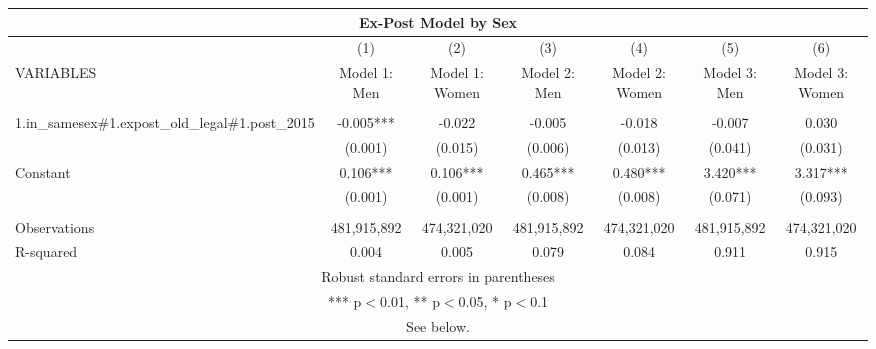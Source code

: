 \begin{tabular}{lcccccc}
\multicolumn{7}{c}{Ex-Post Model by Sex} \\ \hline
 & (1) & (2) & (3) & (4) & (5) & (6) \\
VARIABLES & Model 1: Men & Model 1: Women & Model 2: Men & Model 2: Women & Model 3: Men & Model 3: Women \\ \hline
 &  &  &  &  &  &  \\
1.in\_samesex\#1.expost\_old\_legal\#1.post\_2015 & -0.005*** & -0.022 & -0.005 & -0.018 & -0.007 & 0.030 \\
 & (0.001) & (0.015) & (0.006) & (0.013) & (0.041) & (0.031) \\
Constant & 0.106*** & 0.106*** & 0.465*** & 0.480*** & 3.420*** & 3.317*** \\
 & (0.001) & (0.001) & (0.008) & (0.008) & (0.071) & (0.093) \\
 &  &  &  &  &  &  \\
Observations & 481,915,892 & 474,321,020 & 481,915,892 & 474,321,020 & 481,915,892 & 474,321,020 \\
 R-squared & 0.004 & 0.005 & 0.079 & 0.084 & 0.911 & 0.915 \\ \hline
\multicolumn{7}{c}{ Robust standard errors in parentheses} \\
\multicolumn{7}{c}{ *** p$<$0.01, ** p$<$0.05, * p$<$0.1} \\
\multicolumn{7}{c}{ See below.} \\
\end{tabular}
